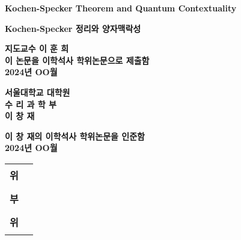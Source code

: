 \begin{titlepage}
    \begin{center}
        
        \LARGE
        \textbf{Kochen-Specker Theorem and Quantum Contextuality}
        
        \vspace{1.0cm}
        \LARGE
        \textbf{Kochen-Specker 정리와 양자맥락성}
        
        \vspace{1.0cm}
        \Large
        \textbf{지도교수 이 훈 희}\\
        \vspace{1.0cm}
        \textbf{이 논문을 이학석사 학위논문으로 제출함}\\
        \textbf{2024년 OO월}
        \vspace{1.0cm}

        \textbf{서울대학교 대학원}\\
        \textbf{수 리 과 학 부}\\
        \textbf{이 창 재}

        \vspace{1.0cm}
        \textbf{이 창 재의 이학석사 학위논문을 인준함}\\
        \textbf{2024년 OO월}
        
        \vfill
     
        \begin{tabular}{cc}
        \textbf{위} & \rule{5.0cm}{1.0pt} \\
        \textbf{부} & \rule{5.0cm}{1.0pt}\\
        \textbf{위} & \rule{5.0cm}{1.0pt}\\
        \end{tabular}
        
    \end{center}
\end{titlepage}